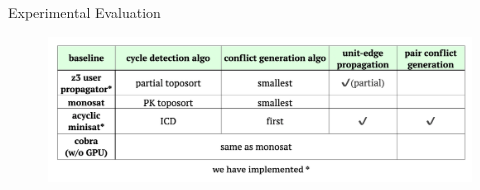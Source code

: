 \begin{frame}{Experimental Evaluation}

	\begin{figure}[H]
		\centering
		\includegraphics[width=\textwidth]{figs/ser-checker-baselines.png}		
	\end{figure}
	
\end{frame}

